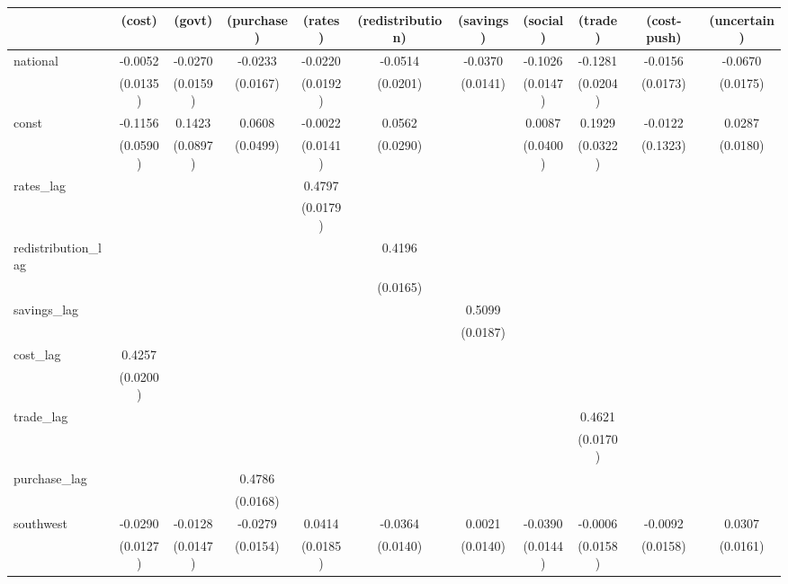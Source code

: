 \begin{tabular}{lcccccccccc}
\toprule
 & (cost) & (govt) & (purchase) & (rates) & (redistribution) & (savings) & (social) & (trade) & (cost-push) & (uncertain) \\
\midrule
national & -0.0052 & -0.0270 & -0.0233 & -0.0220 & -0.0514 & -0.0370 & -0.1026 & -0.1281 & -0.0156 & -0.0670 \\
\vspace{0.2cm}
 & (0.0135) & (0.0159) & (0.0167) & (0.0192) & (0.0201) & (0.0141) & (0.0147) & (0.0204) & (0.0173) & (0.0175) \\
const & -0.1156 & 0.1423 & 0.0608 & -0.0022 & 0.0562 &  & 0.0087 & 0.1929 & -0.0122 & 0.0287 \\
\vspace{0.2cm}
 & (0.0590) & (0.0897) & (0.0499) & (0.0141) & (0.0290) &  & (0.0400) & (0.0322) & (0.1323) & (0.0180) \\
rates_lag &  &  &  & 0.4797 &  &  &  &  &  &  \\
\vspace{0.2cm}
 &  &  &  & (0.0179) &  &  &  &  &  &  \\
redistribution_lag &  &  &  &  & 0.4196 &  &  &  &  &  \\
\vspace{0.2cm}
 &  &  &  &  & (0.0165) &  &  &  &  &  \\
savings_lag &  &  &  &  &  & 0.5099 &  &  &  &  \\
\vspace{0.2cm}
 &  &  &  &  &  & (0.0187) &  &  &  &  \\
cost_lag & 0.4257 &  &  &  &  &  &  &  &  &  \\
\vspace{0.2cm}
 & (0.0200) &  &  &  &  &  &  &  &  &  \\
trade_lag &  &  &  &  &  &  &  & 0.4621 &  &  \\
\vspace{0.2cm}
 &  &  &  &  &  &  &  & (0.0170) &  &  \\
purchase_lag &  &  & 0.4786 &  &  &  &  &  &  &  \\
\vspace{0.2cm}
 &  &  & (0.0168) &  &  &  &  &  &  &  \\
southwest & -0.0290 & -0.0128 & -0.0279 & 0.0414 & -0.0364 & 0.0021 & -0.0390 & -0.0006 & -0.0092 & 0.0307 \\
\vspace{0.2cm}
 & (0.0127) & (0.0147) & (0.0154) & (0.0185) & (0.0140) & (0.0140) & (0.0144) & (0.0158) & (0.0158) & (0.0161) \\

\end{tabular}
